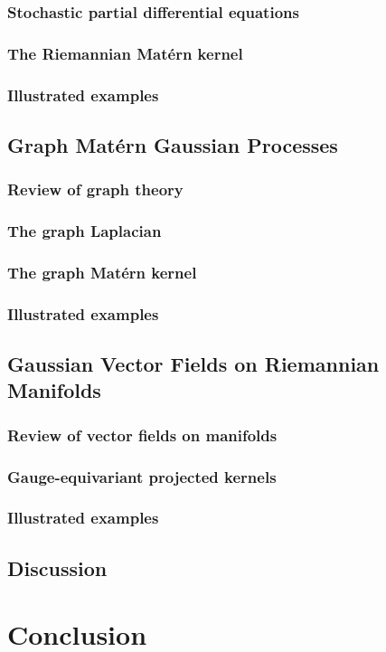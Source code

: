 \documentclass[11pt]{book}
\begin{document}
\subsection{Stochastic partial differential equations}
\subsection{The Riemannian Matérn kernel}
\subsection{Illustrated examples}

\section{Graph Matérn Gaussian Processes}

\subsection{Review of graph theory}
\subsection{The graph Laplacian}
\subsection{The graph Matérn kernel}
\subsection{Illustrated examples}

\section{Gaussian Vector Fields on Riemannian Manifolds}

\subsection{Review of vector fields on manifolds}
\subsection{Gauge-equivariant projected kernels}
\subsection{Illustrated examples}

\section{Discussion}





\chapter{Conclusion}

\printbibliography
\end{document}
